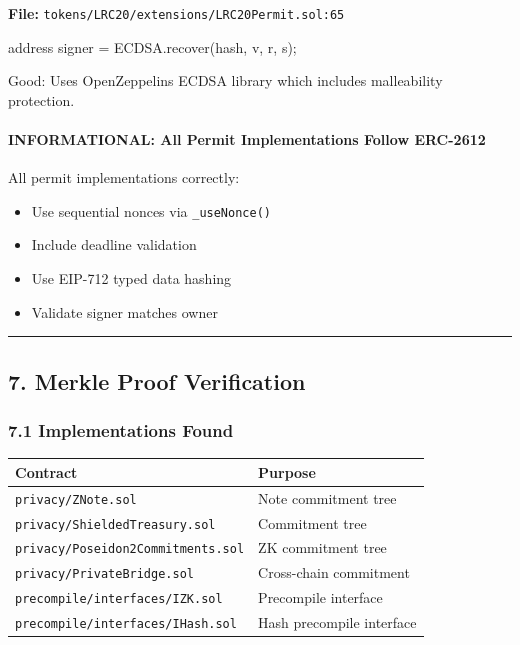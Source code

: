 \documentclass[
]{article}
\newenvironment{Shaded}{}{}
\newcommand{\NormalTok}[1]{#1}
\newcounter{none} %
\providecommand{\tightlist}{%
  \setlength{\itemsep}{0pt}\setlength{\parskip}{0pt}}
\begin{document}
\textbf{File:} \texttt{tokens/LRC20/extensions/LRC20Permit.sol:65}

\begin{Shaded}
\begin{Highlighting}[]
\NormalTok{address signer = ECDSA.recover(hash, v, r, s);}
\end{Highlighting}
\end{Shaded}

Good: Uses OpenZeppelin\textquotesingle s ECDSA library which includes
malleability protection.

\paragraph{INFORMATIONAL: All Permit Implementations Follow
ERC-2612}\label{informational-all-permit-implementations-follow-erc-2612}

All permit implementations correctly:

\begin{itemize}
\tightlist
\item
  Use sequential nonces via \texttt{\_useNonce()}
\item
  Include deadline validation
\item
  Use EIP-712 typed data hashing
\item
  Validate signer matches owner
\end{itemize}

\begin{center}\rule{0.5\linewidth}{0.5pt}\end{center}

\subsection{7. Merkle Proof
Verification}\label{7-merkle-proof-verification}

\subsubsection{7.1 Implementations
Found}\label{71-implementations-found}

{\def\LTcaptype{none} %
\begin{longtable}[]{@{}ll@{}}
\toprule\noalign{}
Contract & Purpose \\
\midrule\noalign{}
\endhead
\bottomrule\noalign{}
\endlastfoot
\texttt{privacy/ZNote.sol} & Note commitment tree \\
\texttt{privacy/ShieldedTreasury.sol} & Commitment tree \\
\texttt{privacy/Poseidon2Commitments.sol} & ZK commitment tree \\
\texttt{privacy/PrivateBridge.sol} & Cross-chain commitment \\
\texttt{precompile/interfaces/IZK.sol} & Precompile interface \\
\texttt{precompile/interfaces/IHash.sol} & Hash precompile interface \\
\end{longtable}
}
\end{document}
